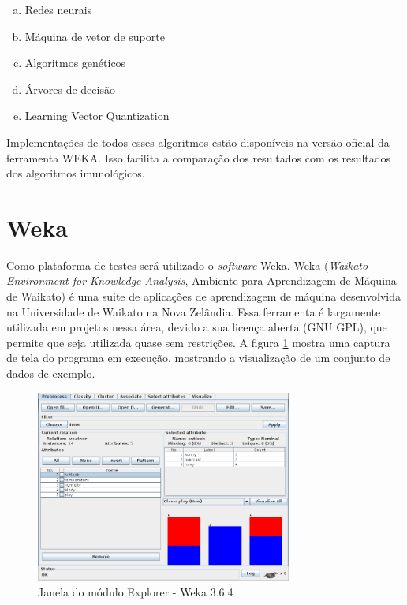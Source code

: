 \begin{enumerate}[a)]
    \item Redes neurais
    \item Máquina de vetor de suporte
    \item Algoritmos genéticos
    \item Árvores de decisão
    \item Learning Vector Quantization
\end{enumerate}

Implementações de todos esses algoritmos estão disponíveis na versão oficial da ferramenta WEKA. Isso facilita a comparação dos resultados com os resultados dos algoritmos imunológicos.

\section{Weka}
\label{sec:prop_weka}

Como plataforma de testes será utilizado o \emph{software} Weka. Weka (\emph{Waikato Environment for Knowledge Analysis}, Ambiente para Aprendizagem de Máquina de Waikato) é uma suite de aplicações de aprendizagem de máquina desenvolvida na Universidade de Waikato na Nova Zelândia. Essa ferramenta é largamente utilizada em projetos nessa área, devido a sua licença aberta (GNU GPL), que permite que seja utilizada quase sem restrições. A figura \ref{fig:prop_weka} mostra uma captura de tela do programa em execução, mostrando a visualização de um conjunto de dados de exemplo.

\begin{figure}[h!]
    \centering
    \caption{Janela do módulo Explorer - Weka 3.6.4}
    \label{fig:prop_weka}
    \includegraphics[width=0.75\textwidth]{img/weka.png}
\end{figure}


